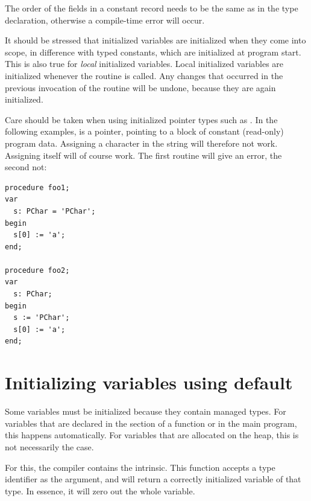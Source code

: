 The order of the fields in a constant record needs to be the same as in the type
declaration, otherwise a compile-time error will occur.

\begin{remark}
It should be stressed that initialized variables are initialized when they
come into scope, in difference with typed constants, which are initialized
at program start.
This is also true for {\em local} initialized variables. Local initialized
variables are initialized whenever the routine is called. Any changes that
occurred in the previous invocation of the routine will be undone, because
they are again initialized.
\end{remark}

\begin{remark}
Care should be taken when using initialized pointer types such as .
In the following examples,  is a pointer, pointing to a block of constant
(read-only) program data.
Assigning a character in the string will therefore not work. Assigning  itself will
of course work. The first routine will give an error, the second not:
\begin{verbatim}
procedure foo1;
var
  s: PChar = 'PChar';
begin
  s[0] := 'a';
end;

procedure foo2;
var
  s: PChar;
begin
  s := 'PChar';
  s[0] := 'a';
end;
\end{verbatim}
\end{remark}

\section{Initializing variables using default}
\label{se:initusingdefault}
Some variables must be initialized because they contain managed types.
For variables that are declared in the   section of a function or in the main program, this happens automatically.
For variables that are allocated on the heap, this is not necessarily the case.

For this, the compiler contains the  intrinsic. This function accepts a type identifier as the argument,
and will return a correctly initialized variable of that type. In essence, it will zero out the whole variable.

